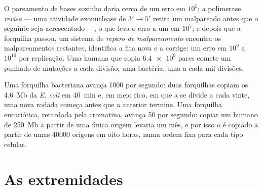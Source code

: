 \begin{proposition}[Fidelidade]\label{prop:b1:replication-mitosis:fidelity}
O pareamento de bases sozinho daria cerca de um erro em $10^5$; a
polimerase \emph{revisa} --- uma atividade exonuclease de $3' \to 5'$
retira um  malpareado antes que o seguinte seja acrescentado
---, o que leva o erro a um em $10^7$; e depois que a forquilha passou,
um sistema de \emph{reparo de malpareamento} encontra os malpareamentos
restantes, identifica a fita nova e a corrige: um erro em $10^9$ a
$10^{10}$  por replicação. Uma  humana que copia
$\num{6.4e9}$ pares comete um punhado de mutações a cada divisão; uma
bactéria, uma a cada mil divisões.
\end{proposition}

\begin{example}\label{ex:b1:replication-mitosis:speed}
Uma forquilha bacteriana avança \qty{1000}{}  por segundo:
duas forquilhas copiam os \qty{4.6}{Mb} da \emph{E. coli} em
\qty{40}{min} e, em meio rico, em que a  se divide a cada vinte,
uma nova rodada começa antes que a anterior termine. Uma forquilha
eucariótica, retardada pela cromatina, avança \qty{50}{} por segundo:
copiar um  humano de \qty{250}{Mb} a partir de uma única
origem levaria um mês, e por isso o  é copiado a partir de umas
\num{40000} origens em oito horas, numa ordem fixa para cada tipo
celular.
\end{example}

\section{As extremidades}

